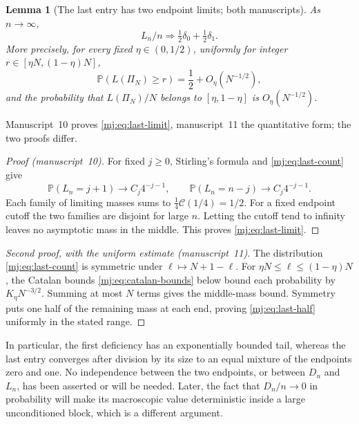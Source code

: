 \documentclass[11pt,a4paper]{article}
\newtheorem{lemma}[lemma]{Lemma}
\theoremstyle{definition}\newaliascnt{definition}{theorem}
\theoremstyle{remark}\newaliascnt{remark}{theorem}
\newcommand{\Cat}{\mathcal C}
\newcommand{\ljP}{\mathbb P}
\begin{document}
\begin{lemma}[The last entry has two endpoint limits; both manuscripts]
\label{mj:lem:last}
As $n\to\infty$,
\begin{equation}
 L_n/n\Longrightarrow\tfrac12\delta_0+\tfrac12\delta_1.
 \label{mj:eq:last-limit}
\end{equation}
More precisely, for every fixed $\eta\in(0,1/2)$, uniformly for integer
$r\in[\eta N,(1-\eta)N]$,
\begin{equation}
 \ljP(L(\Pi_N)\ge r)=\frac12+O_\eta(N^{-1/2}),
 \label{mj:eq:last-half}
\end{equation}
and the probability that $L(\Pi_N)/N$ belongs to $[\eta,1-\eta]$ is
$O_\eta(N^{-1/2})$.
\end{lemma}
Manuscript~10 proves \eqref{mj:eq:last-limit}, manuscript~11 the
quantitative form; the two proofs differ.
\begin{proof}[Proof (manuscript~10)]
For fixed $j\ge0$, Stirling's formula and \eqref{mj:eq:last-count} give
\[
 \ljP(L_n=j+1)\longrightarrow C_j4^{-j-1},\qquad
 \ljP(L_n=n-j)\longrightarrow C_j4^{-j-1}.
\]
Each family of limiting masses sums to $\frac14\Cat(1/4)=1/2$. For a fixed
endpoint cutoff the two families are disjoint for large $n$. Letting the
cutoff tend to infinity leaves no asymptotic mass in the middle. This proves
\eqref{mj:eq:last-limit}.
\end{proof}
\begin{proof}[Second proof, with the uniform estimate (manuscript~11)]
The distribution \eqref{mj:eq:last-count} is symmetric under
$\ell\mapsto N+1-\ell$. For $\eta N\le\ell\le(1-\eta)N$, the Catalan bounds
\eqref{mj:eq:catalan-bounds} below bound each probability by
$K_\eta N^{-3/2}$. Summing at most $N$ terms gives the middle-mass bound.
Symmetry puts one half of the remaining mass at each end, proving
\eqref{mj:eq:last-half} uniformly in the stated range.
\end{proof}

In particular, the first deficiency has an exponentially bounded tail,
whereas the last entry converges after division by its size to an equal
mixture of the endpoints zero and one. No independence between the two
endpoints, or between $D_n$ and $L_n$, has been asserted or will be needed.
Later, the fact that $D_n/n\to0$ in probability will make its macroscopic
value deterministic inside a large unconditioned block, which is a different
argument.
\end{document}
